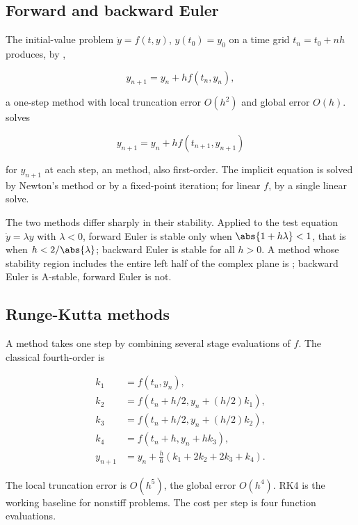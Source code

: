 \subsection{Forward and backward Euler}

The initial-value problem $\dot{y} = f(t, y)$, $y(t_{0}) = y_{0}$
on a time grid $t_{n} = t_{0} + n h$ produces, by ,

\[
y_{n+1} = y_{n} + h f(t_{n}, y_{n}),
\]

a one-step  method with local truncation error
$O(h^{2})$ and global error $O(h)$. 
solves

\[
y_{n+1} = y_{n} + h f(t_{n+1}, y_{n+1})
\]

for $y_{n+1}$ at each step, an  method, also
first-order. The implicit equation is solved by Newton's method
or by a fixed-point iteration; for linear $f$, by a single linear
solve.

The two methods differ sharply in their stability. Applied to the
test equation $\dot{y} = \lambda y$ with $\lambda < 0$, forward
Euler is stable only when $\abs{1 + h\lambda} < 1$, that is when
$h < 2/\abs{\lambda}$; backward Euler is stable for all $h > 0$.
A method whose stability region includes the entire left half of
the complex plane is ; backward Euler is
A-stable, forward Euler is not.

\subsection{Runge-Kutta methods}

A  method takes one step by combining
several stage evaluations of $f$. The classical fourth-order
 is

\begin{align*}
k_{1} &= f(t_{n}, y_{n}), \\
k_{2} &= f(t_{n} + h/2, y_{n} + (h/2) k_{1}), \\
k_{3} &= f(t_{n} + h/2, y_{n} + (h/2) k_{2}), \\
k_{4} &= f(t_{n} + h, y_{n} + h k_{3}), \\
y_{n+1} &= y_{n} + \frac{h}{6}(k_{1} + 2 k_{2} + 2 k_{3} + k_{4}).
\end{align*}

The local truncation error is $O(h^{5})$, the global error
$O(h^{4})$. RK4 is the working baseline for nonstiff problems.
The cost per step is four function evaluations.

